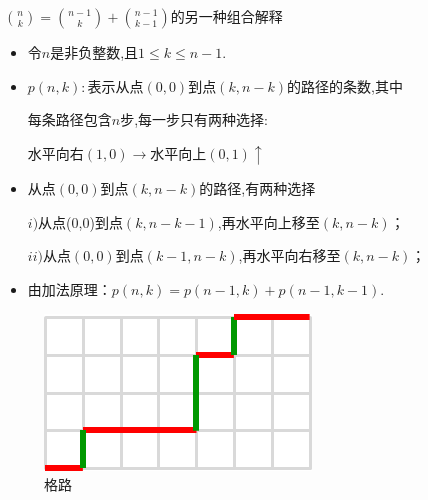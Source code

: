 \documentclass[10pt,punct]{ctexbeamer}
\begin{document}
\begin{frame}{$\binom{n}{k}=\binom{n-1}{k}+\binom{n-1}{k-1}$的另一种组合解释}

    \begin{itemize}

        \item 令$n$是非负整数,且$1\leq k\leq n-1$.

        \item  $p(n,k):$表示从点$(0,0)$到点$(k,n-k)$的路径的条数,其中

        每条路径包含$n$步,每一步只有两种选择:
        \begin{center}
            水平向右$(1,0) \rightarrow$\quad \quad  水平向上$(0,1) \uparrow$
        \end{center}


        \item 从点$(0,0)$到点$(k,n-k)$的路径,有两种选择

        $i)$从点(0,0)到点$(k,n-k-1)$,再水平向上移至$(k,n-k)$；

        $ii) $从点$(0,0)$到点$(k-1,n-k)$,再水平向右移至$(k,n-k)$；

        \item 由加法原理：$p(n,k)=p(n-1,k)+p(n-1,k-1)$.


    \end{itemize}
    \begin{figure}
        \centering
        \includegraphics[scale=0.3]{path.png}
        \caption{格路}
    \end{figure}
\end{frame}
\end{document}
